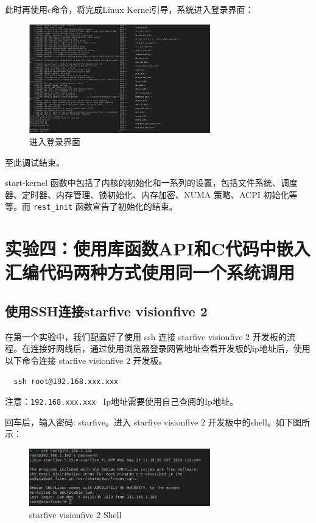 \documentclass[lang=cn,10pt]{elegantbook}
\begin{document}
此时再使用c命令，将完成Linux Kernel引导，系统进入登录界面：
\begin{figure}[htbp]
  \centering
  \includegraphics[width=0.7\textwidth]{image/image-20231105113622844.png}
  \caption{进入登录界面}
\end{figure}

至此调试结束。

start-kernel 函数中包括了内核的初始化和一系列的设置，包括文件系统、调度器、定时器、内存管理、锁初始化、内存加密、NUMA 策略、ACPI 初始化等等。而 \lstinline{rest_init} 函数宣告了初始化的结束。

\chapter{实验四：使用库函数API和C代码中嵌入汇编代码两种方式使用同一个系统调用}
\section{使用SSH连接starfive visionfive 2}
在第一个实验中，我们配置好了使用 ssh 连接 starfive visionfive 2 开发板的流程。在连接好网线后，通过使用浏览器登录网管地址查看开发板的ip地址后，使用以下命令连接 starfive visionfive 2 开发板。

\begin{lstlisting}
  ssh root@192.168.xxx.xxx
\end{lstlisting}

注意：\lstinline{192.168.xxx.xxx } Ip地址需要使用自己查阅的Ip地址。

回车后，输入密码: starfive。进入 starfive visionfive 2 开发板中的shell。如下图所示：

\begin{figure}[htbp]
  \centering
  \includegraphics[width=0.7\textwidth]{image/image-20231105133005556.png}
  \caption{ starfive visionfive 2 Shell}
\end{figure}
\end{document}
